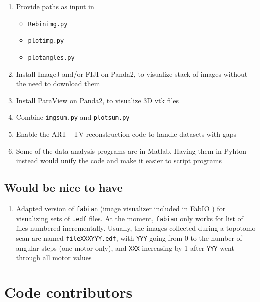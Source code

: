 \documentclass[11pt]{scrartcl}
\begin{document}
\begin{enumerate}
    \item Provide paths as input in 
    \begin{itemize}
        \item {\texttt{Rebin\textunderscore img.py}}
        \item {\texttt{plot\textunderscore img.py}}
        \item {\texttt{plot\textunderscore angles.py}}
    \end{itemize}
    \item Install ImageJ and/or {\footnotesize{FIJI}} on Panda2, to visualize stack of images without the need to download them
    \item Install ParaView on Panda2, to visualize {\footnotesize{3D}} vtk files
    \item Combine {\texttt{img\textunderscore sum.py}} and {\texttt{plot\textunderscore sum.py}}
    \item Enable the {\footnotesize{ART - TV}} reconstruction code to handle datasets with gaps
    \item Some of the data analysis programs are in Matlab. Having them in Pyhton instead would unify the code and make it easier to script programs 
\end{enumerate}

\subsection{Would be nice to have}

\begin{enumerate}
    \item Adapted version of {\texttt{fabian}} (image visualizer included in FabIO \cite{knudsen2013fabio}) for visualizing sets of {\texttt{.edf}} files. At the moment, {\texttt{fabian}} only works for list of files numbered incrementally. Usually, the images collected during a topotomo scan are named {\texttt{file\textunderscore XXX\textunderscore YYY.edf}}, with {\texttt{YYY}} going from 0 to the number of angular steps (one motor only), and {\texttt{XXX}} increasing by 1 after {\texttt{YYY}} went through all motor values
\end{enumerate}

\section{Code contributors}
\end{document}
